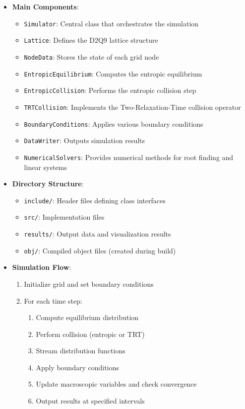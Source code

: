 \documentclass[12pt,a4paper]{article}
\begin{document}
\begin{itemize}
    \item \textbf{Main Components}:
    \begin{itemize}
        \item \texttt{Simulator}: Central class that orchestrates the simulation
        \item \texttt{Lattice}: Defines the D2Q9 lattice structure
        \item \texttt{NodeData}: Stores the state of each grid node
        \item \texttt{EntropicEquilibrium}: Computes the entropic equilibrium
        \item \texttt{EntropicCollision}: Performs the entropic collision step
        \item \texttt{TRTCollision}: Implements the Two-Relaxation-Time collision operator
        \item \texttt{BoundaryConditions}: Applies various boundary conditions
        \item \texttt{DataWriter}: Outputs simulation results
        \item \texttt{NumericalSolvers}: Provides numerical methods for root finding and linear systems
    \end{itemize}

    \item \textbf{Directory Structure}:
    \begin{itemize}
        \item \texttt{include/}: Header files defining class interfaces
        \item \texttt{src/}: Implementation files
        \item \texttt{results/}: Output data and visualization results
        \item \texttt{obj/}: Compiled object files (created during build)
    \end{itemize}

    \item \textbf{Simulation Flow}:
    \begin{enumerate}
        \item Initialize grid and set boundary conditions
        \item For each time step:
        \begin{enumerate}
            \item Compute equilibrium distribution
            \item Perform collision (entropic or TRT)
            \item Stream distribution functions
            \item Apply boundary conditions
            \item Update macroscopic variables and check convergence
            \item Output results at specified intervals
        \end{enumerate}
    \end{enumerate}
\end{itemize}
\end{document}
